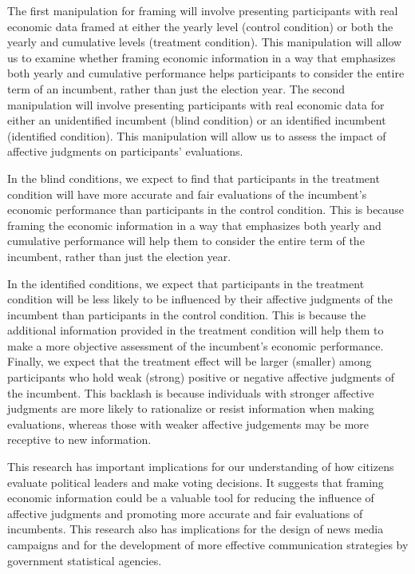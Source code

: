 \documentclass[
]{article}
\begin{document}
The first manipulation for framing will involve presenting participants
with real economic data framed at either the yearly level (control
condition) or both the yearly and cumulative levels (treatment
condition). This manipulation will allow us to examine whether framing
economic information in a way that emphasizes both yearly and cumulative
performance helps participants to consider the entire term of an
incumbent, rather than just the election year. The second manipulation
will involve presenting participants with real economic data for either
an unidentified incumbent (blind condition) or an identified incumbent
(identified condition). This manipulation will allow us to assess the
impact of affective judgments on participants' evaluations.

In the blind conditions, we expect to find that participants in the
treatment condition will have more accurate and fair evaluations of the
incumbent's economic performance than participants in the control
condition. This is because framing the economic information in a way
that emphasizes both yearly and cumulative performance will help them to
consider the entire term of the incumbent, rather than just the election
year.

In the identified conditions, we expect that participants in the
treatment condition will be less likely to be influenced by their
affective judgments of the incumbent than participants in the control
condition. This is because the additional information provided in the
treatment condition will help them to make a more objective assessment
of the incumbent's economic performance. Finally, we expect that the
treatment effect will be larger (smaller) among participants who hold
weak (strong) positive or negative affective judgments of the incumbent.
This backlash is because individuals with stronger affective judgments
are more likely to rationalize or resist information when making
evaluations, whereas those with weaker affective judgements may be more
receptive to new information.

This research has important implications for our understanding of how
citizens evaluate political leaders and make voting decisions. It
suggests that framing economic information could be a valuable tool for
reducing the influence of affective judgments and promoting more
accurate and fair evaluations of incumbents. This research also has
implications for the design of news media campaigns and for the
development of more effective communication strategies by government
statistical agencies.
\end{document}
